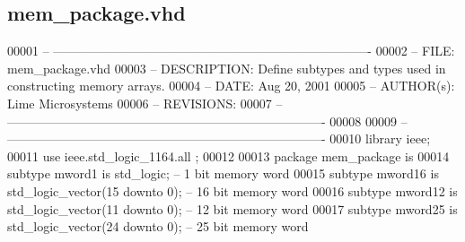 \subsection{mem\+\_\+package.\+vhd}
\label{mem__package_8vhd_source}

\begin{DoxyCode}
00001 \textcolor{keyword}{-- ---------------------------------------------------------------------------- }
00002 \textcolor{keyword}{-- FILE:    mem\_package.vhd}
00003 \textcolor{keyword}{-- DESCRIPTION: Define subtypes and types used in constructing memory arrays.}
00004 \textcolor{keyword}{-- DATE:    Aug 20, 2001}
00005 \textcolor{keyword}{-- AUTHOR(s):   Lime Microsystems}
00006 \textcolor{keyword}{-- REVISIONS:}
00007 \textcolor{keyword}{-- ---------------------------------------------------------------------------- }
00008 
00009 \textcolor{keyword}{-- ----------------------------------------------------------------------------}
00010 \textcolor{vhdlkeyword}{library }\textcolor{keywordflow}{ieee}; 
00011 \textcolor{vhdlkeyword}{use }ieee.std\_logic\_1164.\textcolor{keywordflow}{all} ;
00012 
00013 \textcolor{keywordflow}{package }mem_package \textcolor{keywordflow}{is} 
00014     \textcolor{keywordflow}{subtype} \textcolor{vhdlchar}{mword1} \textcolor{keywordflow}{is} \textcolor{comment}{std\_logic};\textcolor{keyword}{                   -- 1 bit memory word}
00015     \textcolor{keywordflow}{subtype} \textcolor{vhdlchar}{mword16} \textcolor{keywordflow}{is} \textcolor{comment}{std\_logic\_vector}\textcolor{vhdlchar}{(}\textcolor{vhdllogic}{}\textcolor{vhdllogic}{15} \textcolor{keywordflow}{downto} \textcolor{vhdllogic}{}\textcolor{vhdllogic}{0}\textcolor{vhdlchar}{)};\textcolor{keyword}{      -- 16 bit memory word}
00016     \textcolor{keywordflow}{subtype} \textcolor{vhdlchar}{mword12} \textcolor{keywordflow}{is} \textcolor{comment}{std\_logic\_vector}\textcolor{vhdlchar}{(}\textcolor{vhdllogic}{}\textcolor{vhdllogic}{11} \textcolor{keywordflow}{downto} \textcolor{vhdllogic}{}\textcolor{vhdllogic}{0}\textcolor{vhdlchar}{)};\textcolor{keyword}{      -- 12 bit memory word}
00017     \textcolor{keywordflow}{subtype} \textcolor{vhdlchar}{mword25} \textcolor{keywordflow}{is} \textcolor{comment}{std\_logic\_vector}\textcolor{vhdlchar}{(}\textcolor{vhdllogic}{}\textcolor{vhdllogic}{24} \textcolor{keywordflow}{downto} \textcolor{vhdllogic}{}\textcolor{vhdllogic}{0}\textcolor{vhdlchar}{)};\textcolor{keyword}{      -- 25 bit memory word}

\end{DoxyCode}
